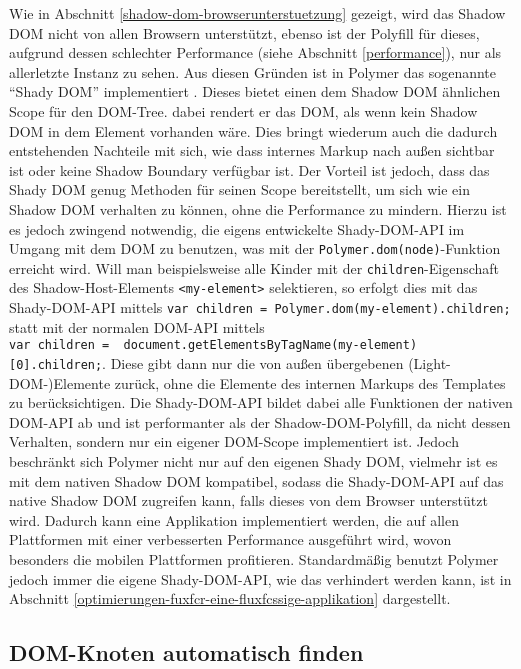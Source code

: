 Wie in Abschnitt \ref{shadow-dom-browserunterstuetzung} gezeigt, wird das Shadow \ac{DOM} nicht von allen Browsern unterstützt, ebenso ist der Polyfill für dieses, aufgrund dessen schlechter Performance (siehe Abschnitt \ref{performance}), nur als allerletzte Instanz zu sehen. Aus diesen Gründen ist in Polymer das sogenannte ``Shady \ac{DOM}'' implementiert \cite{citeulike:13886251}. Dieses bietet einen dem Shadow \ac{DOM} ähnlichen Scope für den \ac{DOM}-Tree. dabei rendert er das \ac{DOM}, als wenn kein Shadow \ac{DOM} in dem Element vorhanden wäre. Dies bringt wiederum auch die dadurch entstehenden Nachteile mit sich, wie dass internes Markup nach außen sichtbar ist oder keine Shadow Boundary verfügbar ist. Der Vorteil ist jedoch, dass das Shady \ac{DOM} genug Methoden für seinen Scope bereitstellt, um sich wie ein Shadow \ac{DOM} verhalten zu können, ohne die Performance zu mindern. Hierzu ist es jedoch zwingend notwendig, die eigens entwickelte Shady-\ac{DOM}-\ac{API} im Umgang mit dem \ac{DOM} zu benutzen, was mit der \texttt{Polymer.dom(node)}-Funktion erreicht wird. Will man beispielsweise alle Kinder mit der \texttt{children}-Eigenschaft des Shadow-Host-Elements \texttt{\textless{}my-element\textgreater{}} selektieren, so erfolgt dies mit das Shady-\ac{DOM}-\ac{API} mittels \texttt{var\ children\ =\ Polymer.dom(my-element).children;} statt mit der normalen \ac{DOM}-\ac{API} mittels \texttt{var\ children\ =\ \ document.getElementsByTagName(\dq my-element\dq){[}0{]}.children;}. Diese gibt dann nur die von außen übergebenen (Light-\ac{DOM}-)Elemente zurück, ohne die Elemente des internen Markups des Templates zu berücksichtigen. Die Shady-\ac{DOM}-\ac{API} bildet dabei alle Funktionen der nativen \ac{DOM}-\ac{API} ab und ist performanter als der Shadow-\ac{DOM}-Polyfill, da nicht dessen Verhalten, sondern nur ein eigener \ac{DOM}-Scope implementiert ist. Jedoch beschränkt sich Polymer nicht nur auf den eigenen Shady \ac{DOM}, vielmehr ist es mit dem nativen Shadow \ac{DOM} kompatibel, sodass die Shady-\ac{DOM}-\ac{API} auf das native Shadow \ac{DOM} zugreifen kann, falls dieses von dem Browser unterstützt wird. Dadurch kann eine Applikation implementiert werden, die auf allen Plattformen mit einer verbesserten Performance ausgeführt wird, wovon besonders die mobilen Plattformen profitieren. Standardmäßig benutzt Polymer jedoch immer die eigene Shady-\ac{DOM}-\ac{API}, wie das verhindert werden kann, ist in Abschnitt \ref{optimierungen-fuxfcr-eine-fluxfcssige-applikation} dargestellt.


\subsection{DOM-Knoten automatisch finden}\label{dom-knoten-automatisch-finden}

